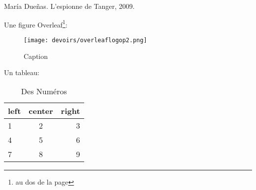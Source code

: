 \documentclass{article}
\begin{document}
\begin{thebibliography}{1}
 María Dueñas. L'espionne de Tanger, 2009.

\end{thebibliography}

Une figure Overleaf\footnote{au dos de la page}:
\begin{figure}[h]
    \centering
    \texttt{[image: devoirs/overleaflogop2.png]}
    \caption{Caption}
    \label{fig:my_label}
\end{figure}

Un tableau:
\begin{table}[h]
    \centering
    \begin{tabular}{l|c||r}
    left & center & right \\ \hline
        1 & 2 & 3 \\
        4 & 5 & 6 \\
        7 & 8 & 9 \\
    \end{tabular}
    \caption{Des Numéros}
    \label{tab:un_label}
\end{table}  
\end{document}
